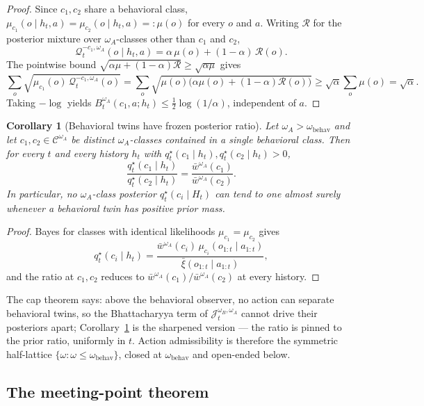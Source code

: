 \documentclass[11pt]{article}
\newtheorem{corollary}[theorem]{Corollary}
\theoremstyle{definition}
\theoremstyle{remark}
\newcommand{\Ccal}{\mathcal{C}}
\newcommand{\Qcal}{\mathcal{Q}}
\newcommand{\Rcal}{\mathcal{R}}
\newcommand{\barxi}{\bar{\xi}}
\begin{document}
\begin{proof}
Since $c_1,c_2$ share a behavioral class, $\mu_{c_1}(o\mid h_t,a)=\mu_{c_2}(o\mid h_t,a)=:\mu(o)$ for every $o$ and $a$. Writing $\Rcal$ for the posterior mixture over $\omega_A$-classes other than $c_1$ and $c_2$,
\[
\Qcal_t^{-c_1,\omega_A}(o\mid h_t,a)=\alpha\,\mu(o)+(1-\alpha)\,\Rcal(o).
\]
The pointwise bound $\sqrt{\alpha\mu+(1-\alpha)\Rcal}\ge\sqrt{\alpha\mu}$ gives
\[
\sum_o\sqrt{\mu_{c_1}(o)\,\Qcal_t^{-c_1,\omega_A}(o)}=\sum_o\sqrt{\mu(o)\bigl(\alpha\mu(o)+(1-\alpha)\Rcal(o)\bigr)}\ge\sqrt{\alpha}\sum_o\mu(o)=\sqrt{\alpha}.
\]
Taking $-\log$ yields $B_t^{\omega_A}(c_1,a;h_t)\le\tfrac{1}{2}\log(1/\alpha)$, independent of $a$.
\end{proof}

\begin{corollary}[Behavioral twins have frozen posterior ratio]
\label{cor:twins-frozen-ratio}
Let $\omega_A>\omega_{\mathrm{behav}}$ and let $c_1,c_2\in\Ccal^{\omega_A}$ be distinct $\omega_A$-classes contained in a single behavioral class. Then for every $t$ and every history $h_t$ with $q_t^\star(c_1\mid h_t),q_t^\star(c_2\mid h_t)>0$,
\[
\frac{q_t^\star(c_1\mid h_t)}{q_t^\star(c_2\mid h_t)}=\frac{\bar w^{\omega_A}(c_1)}{\bar w^{\omega_A}(c_2)}.
\]
In particular, no $\omega_A$-class posterior $q_t^\star(c_i\mid H_t)$ can tend to one almost surely whenever a behavioral twin has positive prior mass.
\end{corollary}

\begin{proof}
Bayes for classes with identical likelihoods $\mu_{c_1}=\mu_{c_2}$ gives
\[
q_t^\star(c_i\mid h_t)=\frac{\bar w^{\omega_A}(c_i)\,\mu_{c_i}(o_{1:t}\mid a_{1:t})}{\barxi(o_{1:t}\mid a_{1:t})},
\]
and the ratio at $c_1,c_2$ reduces to $\bar w^{\omega_A}(c_1)/\bar w^{\omega_A}(c_2)$ at every history.
\end{proof}

The cap theorem says: above the behavioral observer, no action can separate behavioral twins, so the Bhattacharyya term of $\mathcal J_t^{\omega_B,\omega_A}$ cannot drive their posteriors apart; Corollary~\ref{cor:twins-frozen-ratio} is the sharpened version --- the ratio is pinned to the prior ratio, uniformly in $t$. Action admissibility is therefore the symmetric half-lattice $\{\omega:\omega\le\omega_{\mathrm{behav}}\}$, closed at $\omega_{\mathrm{behav}}$ and open-ended below.

\subsection{The meeting-point theorem}
\label{sec:meeting-point}
\end{document}

